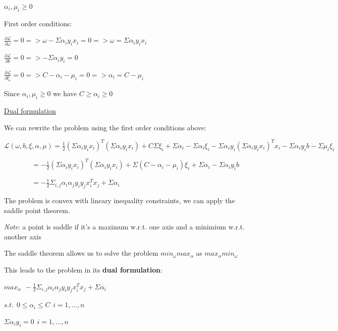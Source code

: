 $\alpha_i, \mu_i \geq 0$

\vspace{5mm}

First order conditions:

$\frac{\partial\mathcal{L}}{\partial\omega} = 0 => \omega - \Sigma \alpha_i y_i x_i = 0 => \omega = \Sigma \alpha_i y_i x_i$

$\frac{\partial\mathcal{L}}{\partial b} = 0 => -\Sigma \alpha_i y_i = 0$

$\frac{\partial\mathcal{L}}{\partial \xi_i} = 0 => C - \alpha_i  - \mu_i = 0 => \alpha_i = C - \mu_i$

Since $\alpha_i, \mu_i \geq 0$ we have $C \geq \alpha_i \geq 0$

\vspace{5mm}

\underline{Dual formulation}

\vspace{5mm}

We can rewrite the problem using the first order conditions above:

$\mathcal{L}(\omega,b,\xi, \alpha, \mu) = \frac{1}{2}(\Sigma \alpha_i y_i x_i)^T(\Sigma \alpha_i y_i x_i)+C\Sigma \xi_i + \Sigma \alpha_i - \Sigma \alpha_i \xi_i - \Sigma \alpha_i y_i (\Sigma \alpha_i y_i x_i)^T x_i - \Sigma \alpha_i y_i b - \Sigma \mu_i \xi_i$

$~~~~~~~~~~~~~~~~~~ = -\frac{1}{2}(\Sigma \alpha_i y_i x_i)^T(\Sigma \alpha_i y_i x_i) + \Sigma(C - \alpha_i - \mu_i)\xi_i + \Sigma \alpha_i - \Sigma \alpha_i y_i b$

$~~~~~~~~~~~~~~~~~~ = -\frac{1}{2}\Sigma_{i,j} \alpha_i \alpha_j y_i y_j x_i^T x_j + \Sigma \alpha_i$

\vspace{5mm}

The problem is convex with lineary inequality constraints, we can apply the saddle point theorem.

\textit{Note}: a point is saddle if it's a maximum w.r.t. one axis and a minimium w.r.t. another axis 

The saddle theorem allows us to solve the problem $min_\omega max_\alpha$ as $max_\alpha min_\omega$

\vspace{5mm}

This leads to the problem in its \textbf{dual formulation}:

\begin{center}

$max_\alpha~~-\frac{1}{2}\Sigma_{i,j} \alpha_i \alpha_j y_i y_j x_i^T x_j + \Sigma \alpha_i$

$s.t.~~0 \leq \alpha_i \leq C~~i=1,...,n$

$\Sigma \alpha_i y_i = 0~~i=1,...,n$

\end{center}

